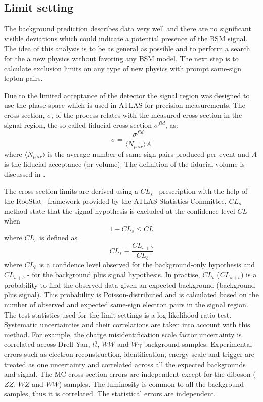 \subsection{Limit setting}

The background prediction describes data very well and there are no significant visible deviations which could indicate a potential presence of the BSM signal.
The idea of this analysis is to be as general as possible and to perform a search for the a new physics without favoring any BSM model.
The next step is to calculate exclusion limits on any type of new physics with prompt same-sign lepton pairs.

Due to the limited acceptance of the detector the signal region was designed to use the phase space which is used in ATLAS for precision measurements.
The cross section, $\sigma$, of the process relates with the measured cross section in the signal region, the so-called fiducial cross section $\sigma^{fid}$, as:
\begin{equation}
 \sigma = \dfrac{\sigma^{fid}}{\langle N_{pair} \rangle A}
 \label{eq:cross_section}
\end{equation}
where $\langle N_{pair} \rangle$ is the average number of same-sign pairs produced per event and $A$ is the fiducial acceptance (or volume).
The definition of the fiducial volume is discussed in .

The cross section limits are derived using a $CL_s$~\cite{CLs_tecnique,CLs_2} prescription with the help of the RooStat~\cite{RooStat_project} framework 
provided by the ATLAS Statistics Committee. $CL_s$ method state that the signal hypothesis is excluded at the confidence level $CL$ when
\begin{equation}
 1 - CL_s \leq CL
\end{equation}
where $CL_s$ is defined as
\begin{equation}
 CL_s \equiv \dfrac{CL_{s+b}}{CL_b}
\end{equation}
where $CL_b$ is a confidence level observed for the background-only hypothesis and $CL_{s+b}$ - for the background plus signal hypothesis.
In practise, $CL_b$ ($CL_{s+b}$) is a probability to find the observed data given an expected background (background plus signal).
This probability is Poisson-distributed and is calculated based on the number of observed and expected same-sign electron pairs in the signal region.
The test-statistics used for the limit settings is a log-likelihood ratio test.
Systematic uncertainties and their correlations are taken into account with this method.
For example, the charge misidentification scale factor uncertainty is correlated across Drell-Yan, $t\bar{t}$, $WW$ and $W\gamma$ background samples.
Experimental errors such as electron reconstruction, identification, energy scale and trigger 
are treated as one uncertainty and correlated across all the expected backgrounds and signal.
The MC cross section errors are independent except for the diboson ($ZZ$, $WZ$ and $WW$) samples.
The luminosity is common to all the background samples, thus it is correlated.
The statistical errors are independent.

